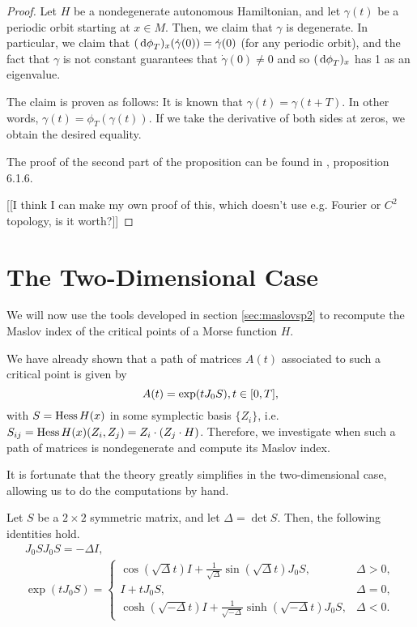 \begin{proof}
Let $H$ be a nondegenerate autonomous Hamiltonian, and let $\gamma(t)$ be a periodic orbit starting at $x \in M$. Then, we claim that $\gamma$ is degenerate. In particular, we claim that $(\dl \phi_T)_x(\dot \gamma(0)) = \dot \gamma(0)$ (for any periodic orbit), and the fact that $\gamma$ is not constant guarantees that $\dot \gamma(0) \neq 0$ and so $(\dl \phi_T)_x$ has 1 as an eigenvalue.

The claim is proven as follows: It is known that $\gamma(t) = \gamma(t+T)$. In other words, $\gamma(t) = \phi_T(\gamma(t))$. If we take the derivative of both sides at zeros, we obtain the desired equality.

\smallskip

The proof of the second part of the proposition can be found in \cite{audin}, proposition 6.1.6.

[[I think I can make my own proof of this, which doesn't use e.g. Fourier or $C^2$ topology, is it worth?]]
\end{proof}

\section{The Two-Dimensional Case}

We will now use the tools developed in section \ref{sec:maslovsp2} to recompute the Maslov index of the critical points of a Morse function $H$.

We have already shown that a path of matrices $A(t)$ associated to such a critical point is given by
\begin{equation}
A(t) = \exp(t J_0 S), t \in \interval 0 T,
\end{equation}
with $S = \operatorname{Hess} H(x)$ in some symplectic basis $\{Z_i\}$, i.e. $S_{ij} = \operatorname{Hess} H(x)(Z_i, Z_j) = Z_i \cdot (Z_j \cdot H)$. Therefore, we investigate when such a path of matrices is nondegenerate and compute its Maslov index.

It is fortunate that the theory greatly simplifies in the two-dimensional case, allowing us to do the computations by hand.

\begin{prop}\label{prop:sidentities}
Let $S$ be a $2 \times 2$ symmetric matrix, and let $\Delta = \det S$. Then, the following identities hold.
\begin{gather}
J_0 S J_0 S = - \Delta I, \label{eq:j0sj0s}\\
\exp(t J_0 S) = \begin{cases}
\cos(\sqrt{\Delta} t) I + \frac1{\sqrt{\Delta}} \sin(\sqrt{\Delta} t) J_0 S, & \Delta > 0,\\
I + t J_0 S, & \Delta = 0,\\
\cosh(\sqrt{-\Delta} t) I + \frac1{\sqrt{-\Delta}} \sinh(\sqrt{-\Delta} t) J_0 S, & \Delta < 0.
\end{cases} \label{eq:exptj0s}
\end{gather}
\end{prop}

